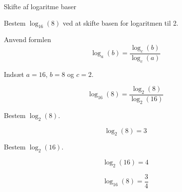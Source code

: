 \documentclass{article}
\begin{document}
\tableofcontents
\newpage

\begin{exercise}{Skifte af logaritme baser}

Bestem $\log_{16}(8)$ ved at skifte basen for logaritmen til 2.


\hint

Anvend formlen 
\[
\log_a(b) = \frac{\log_c(b)}{\log_c(a)}
\]

\hint

Indsæt $a=16$, $b=8$ og $c=2$.

\hint
\[
\log_{16}(8) = \frac{\log_2(8)}{\log_2(16)}
\]

\hint
Bestem $\log_2(8)$.

\hint
\[
\log_2(8) = 3
\]

\hint
Bestem $\log_2(16)$.

\hint
\[
\log_2(16) = 4
\]

\hint
\[
\log_{16}(8) = \frac{3}{4}
\]


\end{exercise}

\newpage
\end{document}
